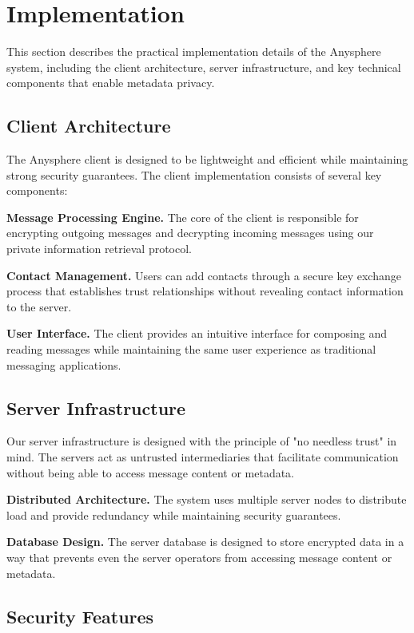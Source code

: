 \section{Implementation}
\label{sec:implementation}

This section describes the practical implementation details of the Anysphere system, including the client architecture, server infrastructure, and key technical components that enable metadata privacy.

\subsection{Client Architecture}

The Anysphere client is designed to be lightweight and efficient while maintaining strong security guarantees. The client implementation consists of several key components:

\textbf{Message Processing Engine.} The core of the client is responsible for encrypting outgoing messages and decrypting incoming messages using our private information retrieval protocol.

\textbf{Contact Management.} Users can add contacts through a secure key exchange process that establishes trust relationships without revealing contact information to the server.

\textbf{User Interface.} The client provides an intuitive interface for composing and reading messages while maintaining the same user experience as traditional messaging applications.

\subsection{Server Infrastructure}

Our server infrastructure is designed with the principle of "no needless trust" in mind. The servers act as untrusted intermediaries that facilitate communication without being able to access message content or metadata.

\textbf{Distributed Architecture.} The system uses multiple server nodes to distribute load and provide redundancy while maintaining security guarantees.

\textbf{Database Design.} The server database is designed to store encrypted data in a way that prevents even the server operators from accessing message content or metadata.

\subsection{Security Features}

